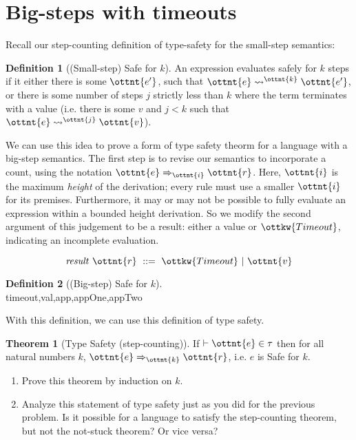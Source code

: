 \documentclass{article}
\theoremstyle{definition}
\newtheorem{theorem}{Theorem}[section]
\newtheorem{definition}{Definition}[section]
\begin{document}
\newpage

\section{Big-steps with timeouts}

Recall our step-counting definition of type-safety for the small-step
semantics:

\begin{definition}[(Small-step) Safe for $k$]
An expression evaluates safely for $k$ steps if it either there is some
$\ottnt{e'}$, such that $ \ottnt{e}  \leadsto^{ \ottnt{k} }  \ottnt{e'} $, or there is some number of steps $j$
strictly less than $k$ where the term terminates with a value 
(i.e. there is some $v$ and $j < k$ such that $ \ottnt{e}  \leadsto^{ \ottnt{j} }  \ottnt{v} $).
\end{definition}

We can use this idea to prove a form of type safety theorm for a language with
a big-step semantics. The first step is to revise our semantics to incorporate
a count, using the notation $ \ottnt{e}  \Rightarrow_{ \ottnt{i} }  \ottnt{r} $.  Here, $\ottnt{i}$ is the maximum
\emph{height} of the derivation; every rule must use a smaller $\ottnt{i}$ for its
premises. Furthermore, it may or may not be possible to fully evaluate an
expression within a bounded height derivation. So we modify the second
argument of this judgement to be a result: either a value or $\ottkw{Timeout}$,
indicating an incomplete evaluation.

\[ \mathit{result}\ \ottnt{r}\ ::=\ \ottkw{Timeout}\ |\ \ottnt{v} \]
\begin{definition}[(Big-step) Safe for $k$]\ \\
{timeout,val,app,appOne,appTwo}
\end{definition}

With this definition, we can use this definition of type safety. 

\begin{theorem}[Type Safety (step-counting)]
If $   \vdash  \ottnt{e}  \in  \tau $ then for all natural numbers $k$, $ \ottnt{e}  \Rightarrow_{ \ottnt{k} }  \ottnt{r} $, i.e. $e$ is Safe for $k$.
\end{theorem}

\begin{enumerate}
\item Prove this theorem by induction on $k$.
\item Analyze this statement of type safety just as you did for the previous problem. Is it possible for a language to satisfy the step-counting theorem, but not the not-stuck theorem? Or vice versa?
\end{enumerate}
\end{document}
